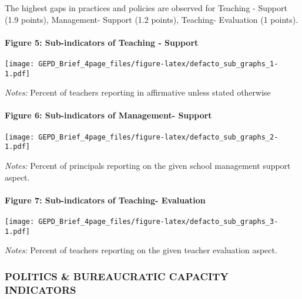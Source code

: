 \documentclass[twocolumn]{article}
\let\oldparagraph\paragraph
\renewcommand{\paragraph}[1]{\oldparagraph{#1}\mbox{}}
\begin{document}
The highest gaps in practices and policies are observed for Teaching -
Support (1.9 points), Management- Support (1.2 points), Teaching-
Evaluation (1 points). \vfill\null

\hypertarget{figure-5-sub-indicators-of-teaching---support}{%
\paragraph{Figure 5: Sub-indicators of Teaching -
Support}\label{figure-5-sub-indicators-of-teaching---support}}

\texttt{[image: GEPD\_Brief\_4page\_files/figure-latex/defacto\_sub\_graphs\_1-1.pdf]}

\color{darkgray}\scriptsize{\textit{Notes:} Percent of teachers reporting in affirmative unless stated otherwise}

\hypertarget{figure-6-sub-indicators-of-management--support}{%
\paragraph{Figure 6: Sub-indicators of Management-
Support}\label{figure-6-sub-indicators-of-management--support}}

\texttt{[image: GEPD\_Brief\_4page\_files/figure-latex/defacto\_sub\_graphs\_2-1.pdf]}

\color{darkgray}\scriptsize{\textit{Notes:} Percent of principals reporting on the given school management support aspect.}

\hypertarget{figure-7-sub-indicators-of-teaching--evaluation}{%
\paragraph{Figure 7: Sub-indicators of Teaching-
Evaluation}\label{figure-7-sub-indicators-of-teaching--evaluation}}

\texttt{[image: GEPD\_Brief\_4page\_files/figure-latex/defacto\_sub\_graphs\_3-1.pdf]}

\color{darkgray}\scriptsize{\textit{Notes:} Percent of teachers reporting on the given teacher evaluation aspect.}

\vfill\null

\hypertarget{politics-bureaucratic-capacity-indicators}{%
\subsubsection{\texorpdfstring{\textbf{POLITICS \& BUREAUCRATIC CAPACITY
INDICATORS}}{POLITICS \& BUREAUCRATIC CAPACITY INDICATORS}}\label{politics-bureaucratic-capacity-indicators}}
\end{document}
